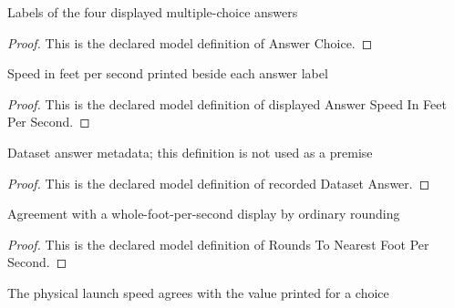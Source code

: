 \begin{definition}
  \label{def:physics:phyx-mini-0751:phyxminiproblems-problemphyxmini0751-answerchoice}
  Labels of the four displayed multiple-choice answers
\end{definition}
\begin{proof}
  This is the declared model definition of Answer Choice.
\end{proof}
\begin{definition}
  \label{def:physics:phyx-mini-0751:phyxminiproblems-problemphyxmini0751-displayedanswerspeedinfeetpersecond}
  Speed in feet per second printed beside each answer label
\end{definition}
\begin{proof}
  This is the declared model definition of displayed Answer Speed In Feet Per Second.
\end{proof}
\begin{definition}
  \label{def:physics:phyx-mini-0751:phyxminiproblems-problemphyxmini0751-recordeddatasetanswer}
  Dataset answer metadata; this definition is not used as a premise
\end{definition}
\begin{proof}
  This is the declared model definition of recorded Dataset Answer.
\end{proof}
\begin{definition}
  \label{def:physics:phyx-mini-0751:phyxminiproblems-problemphyxmini0751-roundstonearestfootpersecond}
  Agreement with a whole-foot-per-second display by ordinary rounding
\end{definition}
\begin{proof}
  This is the declared model definition of Rounds To Nearest Foot Per Second.
\end{proof}
\begin{definition}
  \label{def:physics:phyx-mini-0751:phyxminiproblems-problemphyxmini0751-matchesanswerchoice}
  The physical launch speed agrees with the value printed for a choice
\end{definition}
